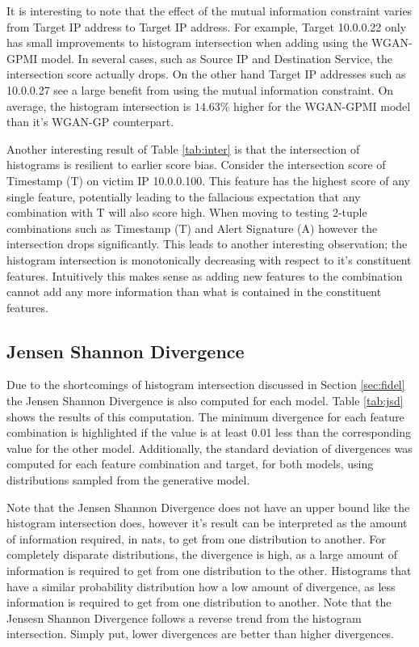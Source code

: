 It is interesting to note that the effect of the mutual information constraint varies from Target IP address to Target IP address. For example, Target 10.0.0.22 only has small improvements to histogram intersection when adding using the WGAN-GPMI model. In several cases, such as Source IP and Destination Service, the intersection score actually drops. On the other hand Target IP addresses such as 10.0.0.27 see a large benefit from using the mutual information constraint. On average, the histogram intersection is $14.63$\% higher for the WGAN-GPMI model than it's WGAN-GP counterpart.

Another interesting result of Table \ref{tab:inter} is that the intersection of histograms is resilient to earlier score bias. Consider the intersection score of Timestamp (T) on victim IP 10.0.0.100. This feature has the highest score of any single feature, potentially leading to the fallacious expectation that any combination with T will also score high. When moving to testing 2-tuple combinations such as Timestamp (T) and Alert Signature (A) however the intersection drops significantly. This leads to another interesting observation; the histogram intersection is monotonically decreasing with respect to it's constituent features. Intuitively this makes sense as adding new features to the combination cannot add any more information than what is contained in the constituent features.

\subsection{Jensen Shannon Divergence}

Due to the shortcomings of histogram intersection discussed in Section \ref{sec:fidel} the Jensen Shannon Divergence is also computed for each model. Table \ref{tab:jsd} shows the results of this computation. The minimum divergence for each feature combination is highlighted if the value is at least 0.01 less than the corresponding value for the other model. Additionally, the standard deviation of divergences was computed for each feature combination and target, for both models, using distributions sampled from the generative model.

Note that the Jensen Shannon Divergence does not have an upper bound like the histogram intersection does, however it's result can be interpreted as the amount of information required, in nats, to get from one distribution to another. For completely disparate distributions, the divergence is high, as a large amount of information is required to get from one distribution to the other. Histograms that have a similar probability distribution how a low amount of divergence, as less information is required to get from one distribution to another. Note that the Jensesn Shannon Divergence follows a reverse trend from the histogram intersection. Simply put, lower divergences are better than higher divergences. 

